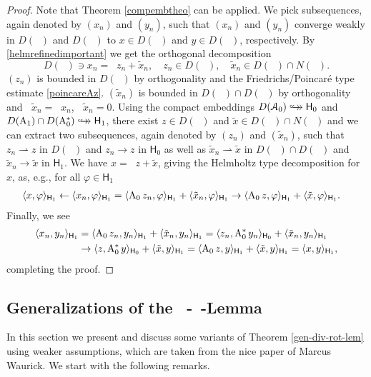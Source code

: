 \documentclass[a4paper]{amsart}
\renewcommand{\H}{\mathsf{H}}
\DeclareMathOperator{\Az}{A_{0}}
\DeclareMathOperator{\Azs}{A_{0}^{*}}
\DeclareMathOperator{\cAz}{\mathcal{A}_{0}}
\DeclareMathOperator{\Ao}{A_{1}}
\newcommand{\cptemb}{\hookto\hspace*{-0.85em}\hookto}
\begin{document}
\begin{proof}
Note that Theorem \ref{compembtheo} can be applied.
We pick subsequences, again denoted by $(x_{n})$ and $(y_{n})$, 
such that $(x_{n})$ and $(y_{n})$ converge weakly in $D(\Ao)$ and $D(\Azs)$ 
to $x\in D(\Ao)$ and $y\in D(\Azs)$, respectively. 
By \eqref{helmrefinedimportant} we get the orthogonal decomposition 
$$D(\Ao)\ni x_{n}=\Az z_{n}+\tilde{x}_{n},\quad
z_{n}\in D(\cAz),\quad
\tilde{x}_{n}\in D(\Ao)\cap N(\Azs).$$ 
$(z_{n})$ is bounded in $D(\cAz)$ by orthogonality 
and the Friedrichs/Poincar\'e type estimate \eqref{poincareAz}.
$(\tilde{x}_{n})$ is bounded in $D(\Ao)\cap D(\Azs)$ by orthogonality 
and $\Ao\tilde{x}_{n}=\Ao x_{n}$, $\Azs\tilde{x}_{n}=0$.
Using the compact embeddings $D(\cAz)\cptemb\H_{0}$ and 
$D(\Ao)\cap D(\Azs)\cptemb\H_{1}$,
there exist $z\in D(\cAz)$ and $\tilde{x}\in D(\Ao)\cap N(\Azs)$
and we can extract two subsequences, again denoted by $(z_{n})$ and $(\tilde{x}_{n})$, 
such that $z_{n}\rightharpoonup z$ in $D(\Az)$ and $z_{n}\to z$ in $\H_{0}$
as well as $\tilde{x}_{n}\rightharpoonup\tilde{x}$ in $D(\Ao)\cap D(\Azs)$ 
and $\tilde{x}_{n}\to\tilde{x}$ in $\H_{1}$. 
We have $x=\Az z+\tilde{x}$, giving the Helmholtz type decomposition for $x$, 
as, e.g., for all $\varphi\in\H_{1}$
\begin{align*}
\scp{x}{\varphi}_{\H_{1}}
&\ot\scp{x_{n}}{\varphi}_{\H_{1}}
=\scp{\Az z_{n}}{\varphi}_{\H_{1}}
+\scp{\tilde{x}_{n}}{\varphi}_{\H_{1}}
\to\scp{\Az z}{\varphi}_{\H_{1}}
+\scp{\tilde{x}}{\varphi}_{\H_{1}}.
\end{align*}
Finally, we see
\begin{align*}
\scp{x_{n}}{y_{n}}_{\H_{1}}
&=\scp{\Az z_{n}}{y_{n}}_{\H_{1}}
+\scp{\tilde{x}_{n}}{y_{n}}_{\H_{1}}
=\scp{z_{n}}{\Azs y_{n}}_{\H_{0}}
+\scp{\tilde{x}_{n}}{y_{n}}_{\H_{1}}\\
&\to\scp{z}{\Azs y}_{\H_{0}}
+\scp{\tilde{x}}{y}_{\H_{1}}
=\scp{\Az z}{y}_{\H_{1}}
+\scp{\tilde{x}}{y}_{\H_{1}}
=\scp{x}{y}_{\H_{1}},
\end{align*}
completing the proof.
\end{proof}

\subsection{Generalizations of the $\Azs$-$\Ao$-Lemma}

In this section we present and discuss 
some variants of Theorem \ref{gen-div-rot-lem} using weaker assumptions,
which are taken from the nice paper \cite{waurick2018a} of Marcus Waurick.
We start with the following remarks.
\end{document}
